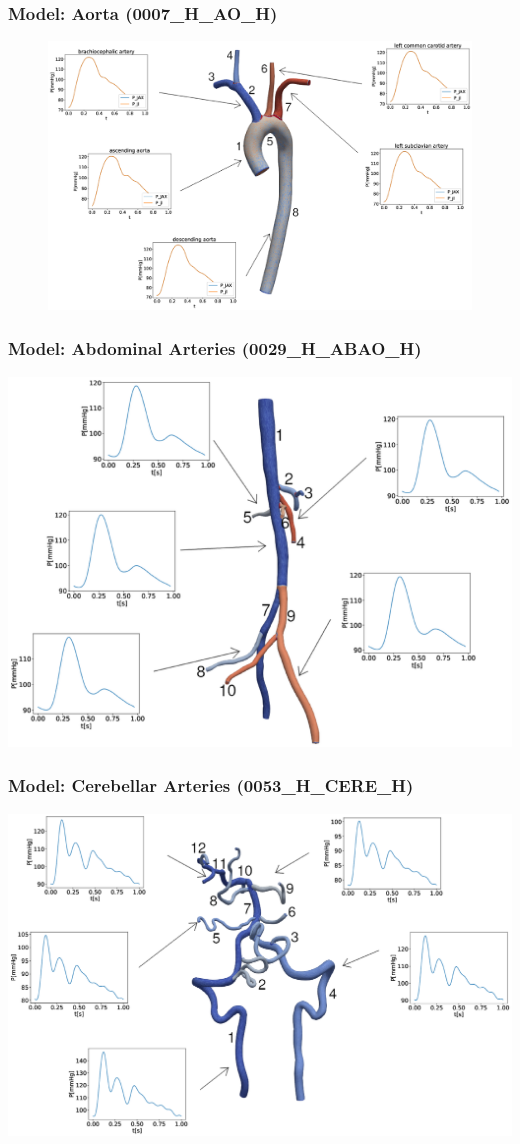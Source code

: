 \documentclass{beamer}
\begin{document}
	\begin{frame}
		\frametitle{Model: Aorta (0007\_H\_AO\_H)}
		\begin{figure} [H]
			\centering
			\includegraphics[width=\columnwidth]{images/0007.eps}
			\label{fig:aorta}
		\end{figure}
	\end{frame}
	\begin{frame}
		\frametitle{Model: Abdominal Arteries (0029\_H\_ABAO\_H)}
		\includegraphics[width=\columnwidth]{images/0029.eps}
	\end{frame}
	\begin{frame}
		\frametitle{Model: Cerebellar Arteries (0053\_H\_CERE\_H)}
		\includegraphics[width=\columnwidth]{images/0053.eps}
	\end{frame}
\end{document}
